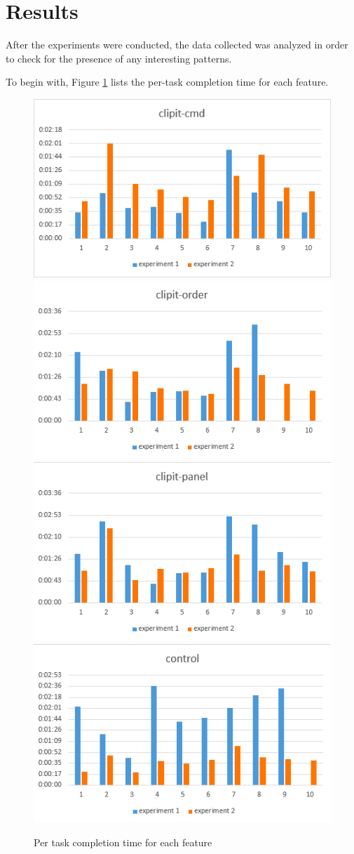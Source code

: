 \documentclass{acm_proc_article-sp}
\begin{document}
\section{Results}\label{sec:results}

After the experiments were conducted, the data collected was analyzed in order to check for the presence of any interesting patterns.

To begin with, Figure \ref{fig:group} lists the per-task completion time for each feature.

\begin{figure}[h]
  \begin{minipage}{0.50\textwidth}
    \centering
    \includegraphics[width=.45\textwidth]{cmd_tasks}\quad
    \includegraphics[width=.45\textwidth]{order_tasks}\\
    \includegraphics[width=.45\textwidth]{panel_tasks}\quad
    \includegraphics[width=.45\textwidth]{control_tasks}
    \caption{Per task completion time for each feature}
    \label{fig:group}
  \end{minipage}
\end{figure}
\end{document}
